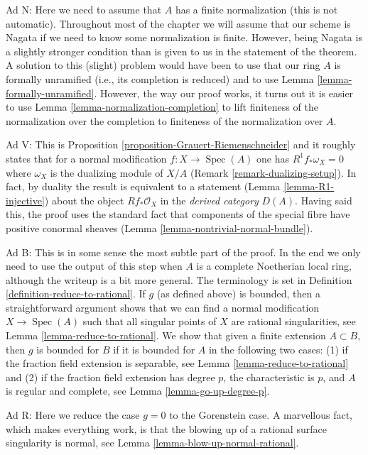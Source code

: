 \documentclass{stacks-project}
\theoremstyle{plain}
\theoremstyle{definition}
\theoremstyle{remark}
\numberwithin{equation}{subsection}
\def\Spec{\mathop{\mathrm{Spec}}}
\begin{document}
\medskip\noindent
Ad N: Here we need to assume that $A$ has a finite normalization
(this is not automatic). Throughout most of the chapter we will
assume that our scheme is Nagata if we need to know some normalization
is finite. However, being Nagata is a slightly stronger condition
than is given to us in the statement of the theorem.
A solution to this (slight) problem would have been to use that
our ring $A$ is formally unramified (i.e., its completion
is reduced) and to use Lemma \ref{lemma-formally-unramified}.
However, the way our proof works, it turns out it is easier to
use Lemma \ref{lemma-normalization-completion}
to lift finiteness of the normalization over the
completion to finiteness of the normalization over $A$.

\medskip\noindent
Ad V: This is Proposition \ref{proposition-Grauert-Riemenschneider}
and it roughly states that for a normal modification $f : X \to \Spec(A)$
one has $R^1f_*\omega_X = 0$ where $\omega_X$ is the dualizing module
of $X/A$ (Remark \ref{remark-dualizing-setup}).
In fact, by duality the result is equivalent to a statement
(Lemma \ref{lemma-R1-injective})
about the object $Rf_*\mathcal{O}_X$ in the {\it derived category} $D(A)$.
Having said this, the proof uses the standard fact that
components of the special fibre have positive conormal
sheaves (Lemma \ref{lemma-nontrivial-normal-bundle}).

\medskip\noindent
Ad B: This is in some sense the most subtle part of the proof.
In the end we only need to use the output of this step when $A$
is a complete Noetherian local ring, although the writeup is a
bit more general. The terminology is set in
Definition \ref{definition-reduce-to-rational}.
If $g$ (as defined above) is bounded, then a straightforward
argument shows that we can find a normal modification $X \to \Spec(A)$
such that all singular points of $X$ are rational singularities, see
Lemma \ref{lemma-reduce-to-rational}. We show that given a finite extension
$A \subset B$, then $g$ is bounded for $B$ if it is bounded for $A$
in the following two cases: (1) if the fraction field extension
is separable, see Lemma \ref{lemma-reduce-to-rational} and
(2) if the fraction field extension has degree $p$,
the characteristic is $p$, and $A$ is regular and complete, see
Lemma \ref{lemma-go-up-degree-p}.

\medskip\noindent
Ad R: Here we reduce the case $g = 0$ to the Gorenstein case.
A marvellous fact, which makes everything work, is that the
blowing up of a rational surface singularity is normal, see
Lemma \ref{lemma-blow-up-normal-rational}.
\end{document}
